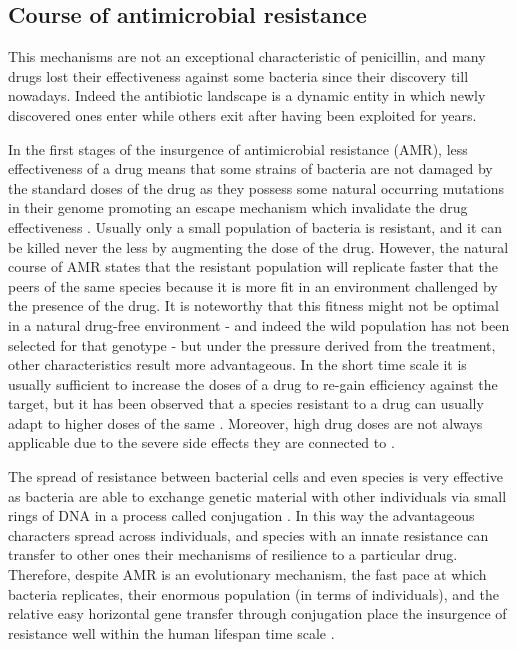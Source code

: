 \subsection{Course of antimicrobial resistance} \label{sec:course_AMR}
This mechanisms are not an exceptional characteristic of penicillin, and many drugs lost their effectiveness against some bacteria since their discovery till nowadays. Indeed the antibiotic landscape is a dynamic entity in which newly discovered ones enter while others exit after having been exploited for years.

In the first stages of the insurgence of antimicrobial resistance (AMR), less effectiveness of a drug means that some strains of bacteria are not damaged by the standard doses of the drug as they possess some natural occurring mutations in their genome promoting an escape mechanism which invalidate the drug effectiveness \cite{Kapoor2017,Blair2014}. Usually only a small population of bacteria is resistant, and it can be killed never the less by augmenting the dose of the drug. However, the natural course of AMR states that the resistant population will replicate faster that the peers of the same species because it is more fit in an environment challenged by the presence of the drug. It is noteworthy that this fitness might not be optimal in a natural drug-free environment - and indeed the wild population has not been selected for that genotype - but under the pressure derived from the treatment, other characteristics result more advantageous.
%
In the short time scale it is usually sufficient to increase the doses of a drug to re-gain efficiency against the target, but it has been observed that a species resistant to a drug can usually adapt to higher doses of the same \cite{????}. Moreover, high drug doses are not always applicable due to the severe side effects they are connected to \cite{????}.

The spread of resistance between bacterial cells and even species is very effective as bacteria are able to exchange genetic material with other individuals via small rings of DNA in a process called conjugation \cite{????}. In this way the advantageous characters spread across individuals, and species with an innate resistance can transfer to other ones their mechanisms of resilience to a particular drug.
%
Therefore, despite AMR is an evolutionary mechanism, the fast pace at which bacteria replicates, their enormous population (in terms of individuals), and the relative easy horizontal gene transfer through conjugation place the insurgence of resistance well within the human lifespan time scale \cite{????}.


